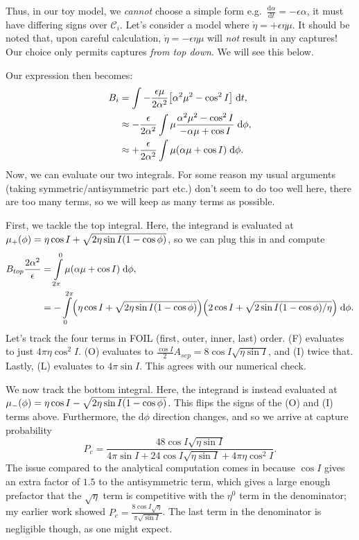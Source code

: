 \documentclass[11pt,
        usenames, %
        dvipsnames %
    ]{article}
\newcommand*{\rd}[2]{\frac{\mathrm{d}#1}{\mathrm{d}#2}}
\DeclarePairedDelimiter\p{\lparen}{\rparen}
\DeclarePairedDelimiter\s{\lbrack}{\rbrack}
\begin{document}
Thus, in our toy model, we \emph{cannot} choose a simple form e.g.\
$\rd{\alpha}{t} = -\epsilon\alpha$, it must have differing signs over
$\mathcal{C}_i$. Let's consider a model where $\dot{\eta} = +\epsilon \eta \mu$.
It should be noted that, upon careful calculation, $\dot{\eta} = -\epsilon \eta
\mu$ will \emph{not} result in any captures! Our choice only permits captures
\emph{from top down}. We will see this below.

Our expression then becomes:
\begin{align*}
    B_i &= \int -\frac{\epsilon \mu}{2\alpha^2}\s*{
        \alpha^2 \mu^2 - \cos^2 I}\;\mathrm{d}t,\\
        &\approx -\frac{\epsilon}{2\alpha^2} \int
            \mu \frac{\alpha^2 \mu^2 - \cos^2 I}{
                -\alpha \mu + \cos I}\;\mathrm{d}\phi,\\
        &\approx +\frac{\epsilon}{2\alpha^2}\int
            \mu\p*{\alpha \mu + \cos I}\;\mathrm{d}\phi.
\end{align*}
Now, we can evaluate our two integrals. For some reason my usual arguments
(taking symmetric/antisymmetric part etc.) don't seem to do too well here, there
are too many terms, so we will keep as many terms as possible.

First, we tackle the top integral. Here, the integrand is evaluated at
$\mu_+(\phi) = \eta \cos I + \sqrt{2\eta \sin I\p*{1 - \cos \phi}}$, so we can
plug this in and compute
\begin{align*}
    B_{top}\frac{2\alpha^2}{\epsilon} &= \int\limits_{2\pi}^{0}
            \mu(\alpha \mu + \cos I)\;\mathrm{d}\phi,\\
        &= -\int\limits_0^{2\pi}
            \p*{\eta \cos I + \sqrt{2\eta \sin I\p*{1 - \cos \phi}}}
                \p*{2\cos I + \sqrt{2\sin I\p*{1 - \cos \phi}/\eta}}
                \;\mathrm{d}\phi.
\end{align*}
Let's track the four terms in FOIL (first, outer, inner, last) order. (F)
evaluates to just $4\pi \eta \cos^2 I$. (O) evaluates to $\frac{\cos
I}{2}A_{sep} = 8\cos I\sqrt{\eta \sin I}$, and (I) twice that. Lastly, (L)
evaluates to $4\pi \sin I$. This agrees with our numerical check.

We now track the bottom integral. Here, the integrand is instead evaluated at
$\mu_-(\phi) = \eta \cos I - \sqrt{2\eta \sin I\p*{1 - \cos \phi}}$. This flips
the signs of the (O) and (I) terms above. Furthermore, the $\mathrm{d}\phi$
direction changes, and so we arrive at capture probability
\begin{equation}
    P_{c} = \frac{48\cos I \sqrt{\eta \sin I}}{
        4\pi \sin I + 24\cos I \sqrt{\eta \sin I} + 4\pi \eta \cos^2 I}.
\end{equation}
The issue compared to the analytical computation comes in because $\cos I$ gives
an extra factor of $1.5$ to the antisymmetric term, which gives a large enough
prefactor that the $\sqrt{\eta}$ term is competitive with the $\eta^0$ term in
the denominator; my earlier work showed $P_c = \frac{8\cos
I\sqrt{\eta}}{\pi \sqrt{\sin I}}$. The last term in the denominator is
negligible though, as one might expect.
\end{document}

